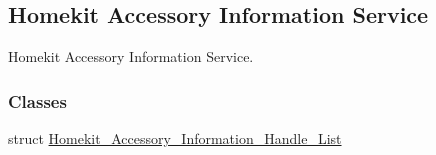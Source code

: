 \hypertarget{group___h_a_i_s}{}\subsection{Homekit Accessory Information Service}
\label{group___h_a_i_s}


Homekit Accessory Information Service.  


\subsubsection*{Classes}
\begin{DoxyCompactItemize}
\item 
struct \hyperlink{struct_homekit___accessory___information___handle___list}{Homekit\+\_\+\+Accessory\+\_\+\+Information\+\_\+\+Handle\+\_\+\+List}
\end{DoxyCompactItemize}
